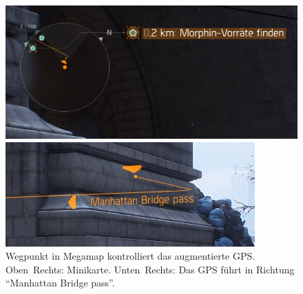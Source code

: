 \begin{figure}[p]
    \begin{minipage}{0.5\linewidth}
        \centering
        \vspace{0pt}
    \end{minipage}%
    \hfill
    \begin{minipage}{0.48\linewidth}
        \centering
        \vspace{0pt}
        \includegraphics[trim={0, 3mm, 0, 2mm}, clip, width=\linewidth]{figures/concept/the_division_minimap}
        
        \includegraphics[trim={0, 1.5mm, 0, 1mm}, clip, width=\linewidth]{figures/concept/the_division_arrow}
    \end{minipage}
    \caption{Wegpunkt in Megamap kontrolliert das augmentierte GPS. %
    Oben~Rechts: Minikarte. %
    Unten~Rechts: Das GPS führt in Richtung \enquote{Manhattan Bridge pass}.}
    \label{fig:tctd_ar-gps}
\end{figure}

